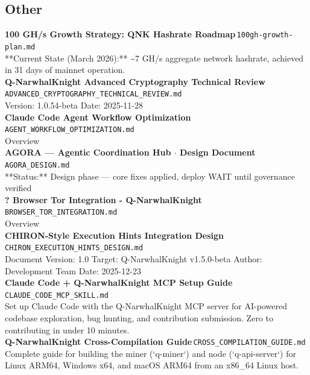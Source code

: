 \documentclass[11pt,a4paper]{article}
\begin{document}
\subsection*{Other}
\noindent\textbf{100 GH/s Growth Strategy: QNK Hashrate Roadmap}\,\textcolor{qgray}{\small \texttt{100gh-growth-plan.md}}\\
**Current State (March 2026):** \textasciitilde{}7 GH/s aggregate network hashrate, achieved in 31 days of mainnet operation.\\[6pt]
\noindent\textbf{Q-NarwhalKnight Advanced Cryptography Technical Review}\,\textcolor{qgray}{\small \texttt{ADVANCED\_CRYPTOGRAPHY\_TECHNICAL\_REVIEW.md}}\\
Version: 1.0.54-beta \textbar{} Date: 2025-11-28\\[6pt]
\noindent\textbf{Claude Code Agent Workflow Optimization}\,\textcolor{qgray}{\small \texttt{AGENT\_WORKFLOW\_OPTIMIZATION.md}}\\
Overview\\[6pt]
\noindent\textbf{AGORA --- Agentic Coordination Hub $\cdot$ Design Document}\,\textcolor{qgray}{\small \texttt{AGORA\_DESIGN.md}}\\
**Status:** Design phase --- core fixes applied, deploy WAIT until governance verified\\[6pt]
\noindent\textbf{? Browser Tor Integration - Q-NarwhalKnight}\,\textcolor{qgray}{\small \texttt{BROWSER\_TOR\_INTEGRATION.md}}\\
Overview\\[6pt]
\noindent\textbf{CHIRON-Style Execution Hints Integration Design}\,\textcolor{qgray}{\small \texttt{CHIRON\_EXECUTION\_HINTS\_DESIGN.md}}\\
Document Version: 1.0 Target: Q-NarwhalKnight v1.5.0-beta Author: Development Team Date: 2025-12-23\\[6pt]
\noindent\textbf{Claude Code + Q-NarwhalKnight MCP Setup Guide}\,\textcolor{qgray}{\small \texttt{CLAUDE\_CODE\_MCP\_SKILL.md}}\\
Set up Claude Code with the Q-NarwhalKnight MCP server for AI-powered codebase exploration, bug hunting, and contribution submission. Zero to contributing in under 10 minutes.\\[6pt]
\noindent\textbf{Q-NarwhalKnight Cross-Compilation Guide}\,\textcolor{qgray}{\small \texttt{CROSS\_COMPILATION\_GUIDE.md}}\\
Complete guide for building the miner (`q-miner`) and node (`q-api-server`) for Linux ARM64, Windows x64, and macOS ARM64 from an x86\_64 Linux host.\\[6pt]
\end{document}
